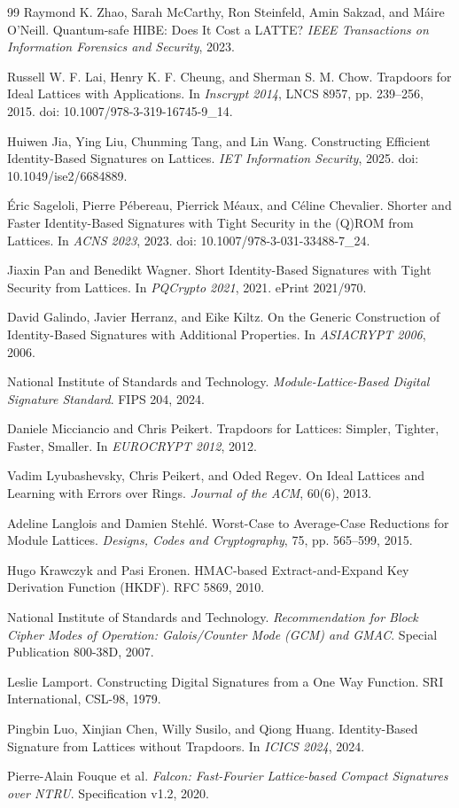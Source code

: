 \documentclass[UTF8,a4paper,12pt,oneside,openany,fontset=fandol]{ctexrep}
\begin{document}
\begin{thebibliography}{99}
Raymond K. Zhao, Sarah McCarthy, Ron Steinfeld, Amin Sakzad, and Máire O'Neill.
Quantum-safe HIBE: Does It Cost a LATTE?
\emph{IEEE Transactions on Information Forensics and Security}, 2023.

Russell W. F. Lai, Henry K. F. Cheung, and Sherman S. M. Chow.
Trapdoors for Ideal Lattices with Applications.
In \emph{Inscrypt 2014}, LNCS 8957, pp. 239--256, 2015.
doi: 10.1007/978-3-319-16745-9\_14.

Huiwen Jia, Ying Liu, Chunming Tang, and Lin Wang.
Constructing Efficient Identity-Based Signatures on Lattices.
\emph{IET Information Security}, 2025.
doi: 10.1049/ise2/6684889.

Éric Sageloli, Pierre Pébereau, Pierrick Méaux, and Céline Chevalier.
Shorter and Faster Identity-Based Signatures with Tight Security in the (Q)ROM from Lattices.
In \emph{ACNS 2023}, 2023.
doi: 10.1007/978-3-031-33488-7\_24.

Jiaxin Pan and Benedikt Wagner.
Short Identity-Based Signatures with Tight Security from Lattices.
In \emph{PQCrypto 2021}, 2021.
ePrint 2021/970.

David Galindo, Javier Herranz, and Eike Kiltz.
On the Generic Construction of Identity-Based Signatures with Additional Properties.
In \emph{ASIACRYPT 2006}, 2006.

National Institute of Standards and Technology.
\emph{Module-Lattice-Based Digital Signature Standard}.
FIPS 204, 2024.

Daniele Micciancio and Chris Peikert.
Trapdoors for Lattices: Simpler, Tighter, Faster, Smaller.
In \emph{EUROCRYPT 2012}, 2012.

Vadim Lyubashevsky, Chris Peikert, and Oded Regev.
On Ideal Lattices and Learning with Errors over Rings.
\emph{Journal of the ACM}, 60(6), 2013.

Adeline Langlois and Damien Stehl\'e.
Worst-Case to Average-Case Reductions for Module Lattices.
\emph{Designs, Codes and Cryptography}, 75, pp. 565--599, 2015.

Hugo Krawczyk and Pasi Eronen.
HMAC-based Extract-and-Expand Key Derivation Function (HKDF).
RFC 5869, 2010.

National Institute of Standards and Technology.
\emph{Recommendation for Block Cipher Modes of Operation: Galois/Counter Mode (GCM) and GMAC}.
Special Publication 800-38D, 2007.

Leslie Lamport.
Constructing Digital Signatures from a One Way Function.
SRI International, CSL-98, 1979.

Pingbin Luo, Xinjian Chen, Willy Susilo, and Qiong Huang.
Identity-Based Signature from Lattices without Trapdoors.
In \emph{ICICS 2024}, 2024.

Pierre-Alain Fouque et al.
\emph{Falcon: Fast-Fourier Lattice-based Compact Signatures over NTRU}.
Specification v1.2, 2020.

\end{thebibliography}
\end{document}
